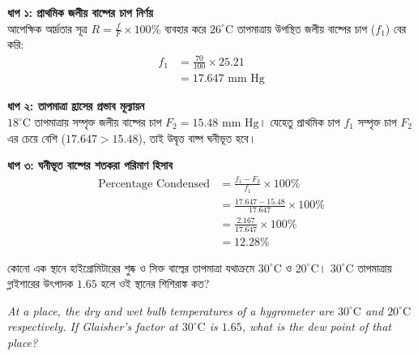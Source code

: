 \documentclass[12pt, a4paper]{article}
\begin{document}
\begin{tcolorbox}[solutionbox={সমাধান (Solution)}]
    \noindent
    \textbf{ধাপ ১: প্রাথমিক জলীয় বাষ্পের চাপ নির্ণয়} \\
    আপেক্ষিক আর্দ্রতার সূত্র $R = \frac{f}{F} \times 100\%$ ব্যবহার করে $26^\circ\text{C}$ তাপমাত্রায় উপস্থিত জলীয় বাষ্পের চাপ ($f_1$) বের করি:
    \begin{align*}
        f_1 &= \frac{70}{100} \times 25.21 \\
        &= 17.647\text{ mm Hg}
    \end{align*}
    
    \vspace{0.4em}
    \noindent\textbf{ধাপ ২: তাপমাত্রা হ্রাসের প্রভাব মূল্যায়ন} \\
    $18^\circ\text{C}$ তাপমাত্রায় সম্পৃক্ত জলীয় বাষ্পের চাপ $F_2 = 15.48\text{ mm Hg}$। যেহেতু প্রাথমিক চাপ $f_1$ সম্পৃক্ত চাপ $F_2$ এর চেয়ে বেশি ($17.647 > 15.48$), তাই উদ্বৃত্ত বাষ্প ঘনীভূত হবে।
    
    \vspace{0.4em}
    \noindent\textbf{ধাপ ৩: ঘনীভূত বাষ্পের শতকরা পরিমাণ হিসাব}
    \begin{align*}
        \text{Percentage Condensed} &= \frac{f_1 - F_2}{f_1} \times 100\% \\
        &= \frac{17.647 - 15.48}{17.647} \times 100\% \\
        &= \frac{2.167}{17.647} \times 100\% \\
        &= \mathbf{12.28\%}
    \end{align*}
\end{tcolorbox}

\vspace{2em}

\begin{tcolorbox}[questionbox={প্রশ্ন (Question) 12}]
    \noindent
    কোনো এক স্থানে হাইগ্রোমিটারের শুষ্ক ও সিক্ত বাল্বের তাপমাত্রা যথাক্রমে $30^\circ\text{C}$ ও $20^\circ\text{C}$। $30^\circ\text{C}$ তাপমাত্রায় গ্লাইশারের উৎপাদক $1.65$ হলে ওই স্থানের শিশিরাঙ্ক কত?
    
    \vspace{0.8em}
    \begin{english}
    \noindent\textit{\color{darkgray}
    At a place, the dry and wet bulb temperatures of a hygrometer are $30^\circ\text{C}$ and $20^\circ\text{C}$ respectively. If Glaisher's factor at $30^\circ\text{C}$ is $1.65$, what is the dew point of that place?
    }
    \end{english}
\end{tcolorbox}
\end{document}
